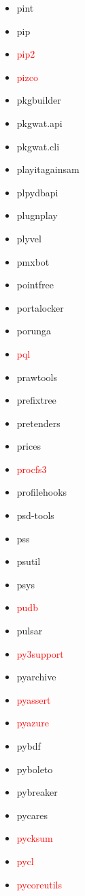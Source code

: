 \documentclass{l4proj}
\begin{document}
\begin{appendices}
{\begin{itemize}
\item pint
\item pip
\item\textcolor{red}{pip2}
\end{itemize}
}%
\noindent\parbox[t]{0.32\textwidth}{\raggedright%
\begin{itemize}
\item\textcolor{red}{pizco}
\item pkgbuilder
\item pkgwat.api
\item pkgwat.cli
\item playitagainsam
\item plpydbapi
\item plugnplay
\item plyvel
\item pmxbot
\item pointfree
\item portalocker
\item porunga
\item\textcolor{red}{pql}
\item prawtools
\item prefixtree
\item pretenders
\item prices
\item\textcolor{red}{procfs3}
\item profilehooks
\item psd-tools
\item pss
\item psutil
\item psys
\item\textcolor{red}{pudb}
\item pulsar
\item\textcolor{red}{py3support}
\item pyarchive
\item\textcolor{red}{pyassert}
\item\textcolor{red}{pyazure}
\item pybdf
\end{itemize}
}%
\noindent\parbox[t]{0.32\textwidth}{\raggedright%
\begin{itemize}
\item pyboleto
\item pybreaker
\item pycares
\item\textcolor{red}{pycksum}
\item\textcolor{red}{pycl}
\item\textcolor{red}{pycoreutils}

\end{itemize}}
\end{appendices}
\end{document}
